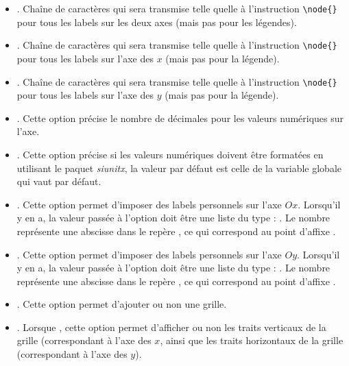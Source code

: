 \begin{itemize}
\begin{itemize}
            \item {}. Chaîne de caractères qui sera transmise telle quelle à l'instruction \verb|\node{}| pour tous les labels sur les deux axes (mais pas pour les légendes).
            
            \item {}. Chaîne de caractères qui sera transmise telle quelle à l'instruction \verb|\node{}| pour tous les labels sur l'axe des $x$ (mais pas pour la légende).
            
             \item {}. Chaîne de caractères qui sera transmise telle quelle à l'instruction \verb|\node{}| pour tous les labels sur l'axe des $y$ (mais pas pour la légende).
            
            \item {}. Cette option précise le nombre de décimales pour les valeurs numériques sur l'axe.
            
            \item {}. Cette option précise si les valeurs numériques doivent être formatées en utilisant le paquet \emph{siunitx}, la valeur par défaut est celle de la variable globale  qui vaut \false par défaut.
            
            \item {}. Cette option permet d'imposer des labels personnels sur l'axe $Ox$. Lorsqu'il y en a, la valeur passée à l'option doit être une liste du type : . Le nombre  représente une abscisse dans le repère , ce qui correspond au point d'affixe .
            
            \item {}. Cette option permet d'imposer des labels personnels sur l'axe $Oy$. Lorsqu'il y en a, la valeur passée à l'option doit être une liste du type :  . Le nombre  représente une abscisse dans le repère , ce qui correspond au point d'affixe .
            
            \item {}. Cette option permet d'ajouter ou non une grille.
            
            \item {}. Lorsque , cette option permet d'afficher ou non les traits verticaux de la grille (correspondant à l'axe des $x$, ainsi que les traits horizontaux de la grille (correspondant à l'axe des $y$).
            

\end{itemize}
\end{itemize}
